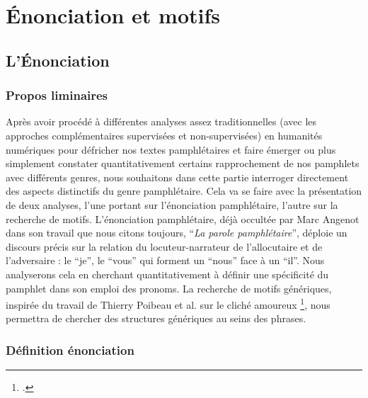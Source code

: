 \part{Énonciation et motifs}

\chapter{L'Énonciation}

\section{Propos liminaires}

Après avoir procédé à différentes analyses assez traditionnelles (avec les approches complémentaires supervisées et non-supervisées) en humanités numériques pour défricher nos textes pamphlétaires et faire émerger ou plus simplement constater quantitativement certains rapprochement de nos pamphlets avec différents genres, nous souhaitons dans cette partie interroger directement des aspects distinctifs du genre pamphlétaire. Cela va se faire avec la présentation de deux analyses, l'une portant sur l'énonciation pamphlétaire, l'autre sur la recherche de motifs. L'énonciation pamphlétaire, déjà occultée par Marc Angenot dans son travail que nous citons toujours, \enquote{\textit{La parole pamphlétaire}}, déploie un discours précis sur la relation du locuteur-narrateur de l'allocutaire et de l'adversaire : le \enquote{je}, le \enquote{vous} qui forment un \enquote{nous} face à un \enquote{il}.  Nous analyserons cela en cherchant quantitativement à définir une spécificité du pamphlet dans son emploi des pronoms. La recherche de motifs génériques, inspirée du travail de Thierry Poibeau et al. sur le cliché amoureux \footcites{legallois_reperer_2016}, nous permettra de chercher des structures génériques au seins des phrases.


\section{Définition énonciation}

